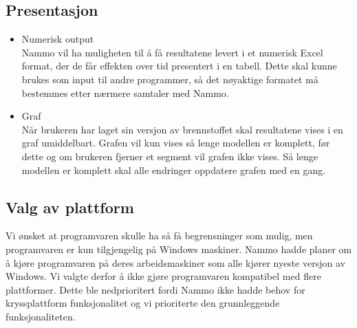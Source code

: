 \subsection{Presentasjon}
\begin{itemize}
    \item Numerisk output\\
    
    Nammo vil ha muligheten til å få resultatene levert i et numerisk Excel format, der de får effekten over tid presentert i en tabell. Dette skal kunne brukes som input til andre programmer, så det nøyaktige formatet må bestemmes etter nærmere samtaler med Nammo.\\
    \item Graf\\
    
    Når brukeren har laget sin versjon av brennstoffet skal resultatene vises i en graf umiddelbart. Grafen vil kun vises så lenge modellen er komplett, før dette og om brukeren fjerner et segment vil grafen ikke vises. Så lenge modellen er komplett skal alle endringer oppdatere grafen med en gang.
    
\end{itemize}

	\subsection{Valg av plattform}
Vi ønsket at programvaren skulle ha så få begrensninger som mulig, men programvaren er kun tilgjengelig på Windows maskiner. Nammo hadde planer om å kjøre programvaren på deres arbeidsmaskiner som alle kjører nyeste versjon av Windows. Vi valgte derfor å ikke gjøre programvaren kompatibel med flere plattformer. Dette ble nedprioritert fordi Nammo ikke hadde behov for kryssplattform funksjonalitet og vi prioriterte den grunnleggende funksjonaliteten.


